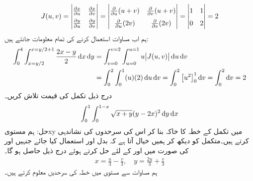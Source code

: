 \begin{align*}
\renewcommand{\arraystretch}{1.5}
J(u,v)=\begin{vmatrix}
\frac{\partial x}{\partial u}&\frac{\partial x}{\partial v}\\
\frac{\partial y}{\partial u}&\frac{\partial y}{\partial v}
\end{vmatrix}=\begin{vmatrix}
\frac{\partial}{\partial u}(u+v)&\frac{\partial}{\partial v}(u+v)\\
\frac{\partial}{\partial u}(2v)&\frac{\partial}{\partial v}(2v)
\end{vmatrix}=\begin{vmatrix}
1&1\\
0&2
\end{vmatrix}=2
\end{align*}
ہم اب مساوات  استعمال کرنے کی تمام معلومات جانتے ہیں:
\begin{align*}
\int_0^4\int_{x=y/2}^{x=y/2+1}\frac{2x-y}{2}\dif x\dif y&=\int_{v=0}^{v=2}\int_{u=0}^{u=1} u\abs{J(u,v)}\dif u\dif v\\
&=\int_0^2\int_0^1 (u)(2)\dif u\dif v=\int_0^2\big[u^2\big]_{0}^{1}\dif v=\int_0^2\dif v=2
\end{align*}
درج ذیل تکمل کی قیمت تلاش کریں۔
\begin{align*}
\int_0^1\int_0^{1-x}\sqrt{x+y}(y-2x)^2\dif y\dif x
\end{align*}
حل:\quad
ہم  مستوی{xy} میں تکمل کے خطہ  کا خاکہ بنا  کر اس کی سرحدوں کی نشاندہی کرتے ہیں۔متکمل کو دیکھ کر ہمیں خیال آتا ہے کہ بدل  اور استعمال کیا جائے جنہیں  اور  کی صورت میں  اور  کے لئے حل کرتے ہوئے درج ذیل حاصل ہو گا۔
\begin{align}\label{مساوات_بالکثرت_سرحدیں_دوبارہ}
x=\frac{u}{3}-\frac{v}{3},\quad y=\frac{2u}{3}+\frac{v}{3}
\end{align}
ہم مساوات  سے مستوی  میں خطہ  کی سرحدیں معلوم کرتے ہیں۔
